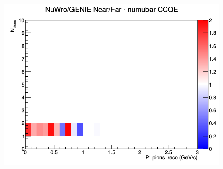 \documentclass[12pt]{article}
\begin{document}
\begin{figure}[h]
\endminipage
{}
\includegraphics[width=\linewidth]{eff_N_P/FGT/pions/ratios/CCQE_NuWro_GENIE_numubar_NF_N_P.png}
\endminipage
\newline
\end{figure}
\clearpage
\end{document}
